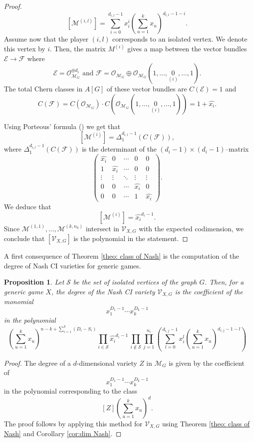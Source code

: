 \documentclass[11pt]{amsart}
\numberwithin{equation}{section}
\theoremstyle{plain}
\numberwithin{theorem}{section}
\newtheorem{proposition}[theorem]{Proposition}
\theoremstyle{definition}
\newcommand{\ko}{{\mathcal O}}
\newcommand{\Mg}{{\mathcal M}_G}
\newcommand{\Vc}{{\mathcal V}_{X,G}}
\begin{document}
\begin{proof}
\[
\left[\mathcal{M}^{(i,l)}\right]=\displaystyle \sum_{i=0}^{d_{i,l}-1} x_i^i\left(\sum_{u=1}^k x_u\right)^{d_{i,l}-1-i}.
\]
Assume now that the player $(i,l)$ corresponds to an isolated vertex. We denote this vertex by $i$. Then, the matrix $M^{(i)}$ gives a map between the vector bundles $\mathcal{E}\rightarrow\mathcal{F}$ where
\[
\mathcal{E}=\ko_{\Mg}^{\oplus d_i} \text{ and } \mathcal{F}= \ko_{\Mg}\oplus\ko_{\Mg}(1,\ldots,\underset{(i)}{0},\ldots,1).
\]
The total Chern classes in $A[G]$ of these vector bundles are $C(\mathcal{E})=1$ and 
\[
C(\mathcal{F}) = C( \ko_{\Mg})\cdot C(\ko_{\Mg}(1,\ldots,\underset{(i)}{0},\ldots,1))= \displaystyle
1+\widehat{x_i}.
\]

\noindent Using Porteous' formula (\cite[Theorem 12.4]{eisenbud20163264}) we get that 
\[
\left[\mathcal{M}^{(i)}\right]=\Delta_1^{d_{i,l}-1}\left( C(\mathcal{F})\right),
\]
where $\Delta_1^{d_{i,l}-1}\left( C(\mathcal{F})\right)$ is the determinant of the $(d_i-1)\times (d_i-1)$--matrix
\[
\begin{pmatrix}
    \widehat{x_i}& 0 &\cdots & 0&0\\
    1 & \widehat{x_i}& \cdots &0&0\\
    \vdots & \vdots  & \ddots & \vdots &\vdots\\
    0 & 0 &\cdots &\widehat{x_i}&0 \\
    0&0&\cdots &1 & \widehat{x_i}
    
\end{pmatrix}.
\]
We deduce that 
\[
\left[\mathcal{M}^{(i)}\right]=\displaystyle\widehat{x_i}^{d_i-1}.
\] 
Since $\mathcal{M}^{(1,1)},\ldots,\mathcal{M}^{(k,n_k)}$ intersect in $\Vc$ with the expected codimension, we conclude that $\left[\Vc\right]$ is the polynomial in the statement.
\end{proof}

\noindent A first consequence of Theorem \ref{theo: class of Nash} is the computation of the degree of Nash CI varieties for generic games.

\begin{proposition}\label{prop:degree Nash}
    Let $\mathcal S$ be the set of isolated vertices of the graph $G$. Then, for a generic game $X$, the degree of the Nash CI variety $\Vc$ is the coefficient of the monomial $$x_1^{D_1-1}\cdots x_k^{D_k-1}$$
    in the polynomial 
    \[
    \displaystyle
    \left(
    \sum_{u=1}^kx_u
    \right)^{n-k+\sum_{i=1}^k(D_i-S_i)}
    \prod_{i\in\mathcal S}\widehat{x_i}^{d_i-1} \,\prod_{i\not\in\mathcal S}\prod_{j=1}^{n_i}\left(    
        \sum_{l=0}^{d_{i,j}-1} x_i^l\left(\sum_{u=1}^kx_u\right)^{d_{i,j}-1-l}
        \right)
    \]
\end{proposition}
\begin{proof}
    The degree of a $d$-dimensional variety $Z$ in $\Mg$ is given by the coefficient of 
    \[
    x_1^{D_1-1}\cdots x_k^{D_k-1}
    \]
    in the polynomial corresponding to the class
    \[
    \left[Z\right]\left(\sum_{u=1}^kx_u\right)^d.
    \]
    The proof follows by applying this method for $\Vc$ using Theorem \ref{theo: class of Nash} and Corollary \ref{cor:dim Nash}.
\end{proof}
\end{document}
